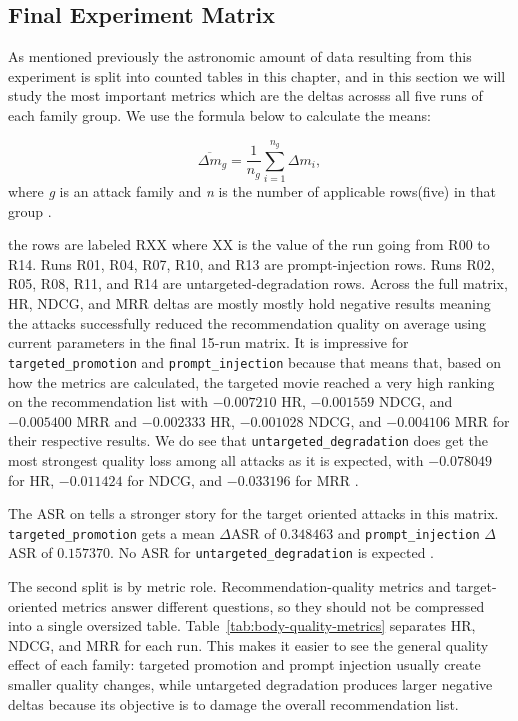 \subsection{Final Experiment Matrix}

As mentioned previously the astronomic amount of data resulting from this experiment is split into counted tables in this chapter, and in this section we will study the most important metrics which are the deltas acrosss all five runs of each family group. We use the formula below to calculate the means:

\begin{equation}
\overline{\Delta m}_{g} = \frac{1}{n_g}\sum_{i=1}^{n_g} \Delta m_i,
\end{equation}
where \textit{g} is an attack family and \textit{n} is the number of applicable rows(five) in that group \cite{ragpoisonlab_repo}. 



the rows are labeled RXX where XX is the value of the run going from R00 to R14. Runs R01, R04, R07, R10, and R13 are prompt-injection rows. Runs R02, R05, R08, R11, and R14 are untargeted-degradation rows. Across the full matrix, HR, NDCG, and MRR deltas are mostly mostly hold negative results meaning the attacks successfully reduced the recommendation quality on average using current parameters in the final 15-run matrix. It is impressive for \texttt{targeted\_promotion} and \texttt{prompt\_injection} because that means that, based on how the metrics are calculated, the targeted movie reached a very high ranking on the recommendation list with \(-0.007210\) HR, \(-0.001559\) NDCG, and \(-0.005400\) MRR and \(-0.002333\) HR, \(-0.001028\) NDCG, and \(-0.004106\) MRR for their respective results. We do see that \texttt{untargeted\_degradation} does get the most strongest quality loss among all attacks as it is expected, with \(-0.078049\) for HR, \(-0.011424\) for NDCG, and \(-0.033196\) for MRR \cite{ragpoisonlab_repo}.

The ASR on tells a stronger story for the target oriented attacks in this matrix. \texttt{targeted\_promotion} gets a mean \(\Delta\)ASR of \(0.348463\) and \texttt{prompt\_injection} \(\Delta\)ASR of \(0.157370\). No ASR for \texttt{untargeted\_degradation} is expected \cite{ragpoisonlab_repo}.


The second split is by metric role. Recommendation-quality metrics and target-oriented metrics answer different questions, so they should not be compressed into a single oversized table. Table~\ref{tab:body-quality-metrics} separates HR, NDCG, and MRR for each run. This makes it easier to see the general quality effect of each family: targeted promotion and prompt injection usually create smaller quality changes, while untargeted degradation produces larger negative deltas because its objective is to damage the overall recommendation list.

